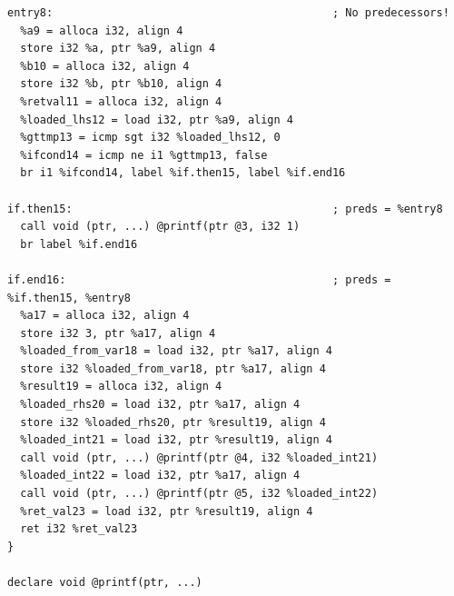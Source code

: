 \begin{lstlisting}
entry8:                                           ; No predecessors!
  %a9 = alloca i32, align 4
  store i32 %a, ptr %a9, align 4
  %b10 = alloca i32, align 4
  store i32 %b, ptr %b10, align 4
  %retval11 = alloca i32, align 4
  %loaded_lhs12 = load i32, ptr %a9, align 4
  %gttmp13 = icmp sgt i32 %loaded_lhs12, 0
  %ifcond14 = icmp ne i1 %gttmp13, false
  br i1 %ifcond14, label %if.then15, label %if.end16

if.then15:                                        ; preds = %entry8
  call void (ptr, ...) @printf(ptr @3, i32 1)
  br label %if.end16

if.end16:                                         ; preds = %if.then15, %entry8
  %a17 = alloca i32, align 4
  store i32 3, ptr %a17, align 4
  %loaded_from_var18 = load i32, ptr %a17, align 4
  store i32 %loaded_from_var18, ptr %a17, align 4
  %result19 = alloca i32, align 4
  %loaded_rhs20 = load i32, ptr %a17, align 4
  store i32 %loaded_rhs20, ptr %result19, align 4
  %loaded_int21 = load i32, ptr %result19, align 4
  call void (ptr, ...) @printf(ptr @4, i32 %loaded_int21)
  %loaded_int22 = load i32, ptr %a17, align 4
  call void (ptr, ...) @printf(ptr @5, i32 %loaded_int22)
  %ret_val23 = load i32, ptr %result19, align 4
  ret i32 %ret_val23
}

declare void @printf(ptr, ...)

\end{lstlisting}


